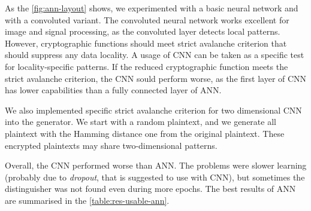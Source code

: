 \documentclass[
  print, %
  Table,   %
  nolof,     %
  nolot,     %
  11pt, %
  oneside  %
]{fithesis3}
\begin{document}
As the \cref{fig:ann-layout} shows, we experimented with a basic neural network and with a convoluted variant. The convoluted neural network works excellent for image and signal processing, as the convoluted layer detects local patterns. However, cryptographic functions should meet strict avalanche criterion that should suppress any data locality. A usage of CNN can be taken as a specific test for locality-specific patterns. If the reduced cryptographic function meets the strict avalanche criterion, the CNN sould perform worse, as the first layer of CNN has lower capabilities than a fully connected layer of ANN.

We also implemented specific strict avalanche criterion for two dimensional CNN into the generator. We start with a random plaintext, and we generate all plaintext with the Hamming distance one from the original plaintext. These encrypted plaintexts may share two-dimensional patterns.

Overall, the CNN performed worse than ANN. The problems were slower learning (probably due to \textit{dropout}, that is suggested to use with CNN), but sometimes the distinguisher was not found even during more epochs. The best results of ANN are summarised in the \cref{table:res-usable-ann}.
\end{document}
